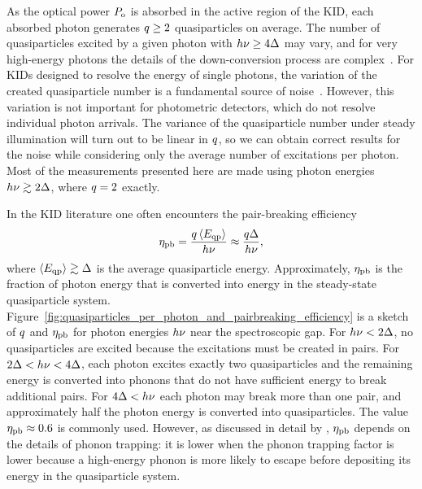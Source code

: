 As the optical power $P_{\mathrm{o}}$ is absorbed in the active region of the KID, each absorbed photon generates $q \ge 2$ quasiparticles on average.
The number of quasiparticles excited by a given photon with $h \nu \ge 4 \Delta$ may vary, and for very high-energy photons the details of the down-conversion process are complex~\autocite{Kozorezov2000PRB}.
For KIDs designed to resolve the energy of single photons, the variation of the created quasiparticle number is a fundamental source of noise~\autocite{Mazin2005}.
However, this variation is not important for photometric detectors, which do not resolve individual photon arrivals.
The variance of the quasiparticle number under steady illumination will turn out to be linear in $q$, so we can obtain correct results for the noise while considering only the average number of excitations per photon.
Most of the measurements presented here are made using photon energies $h \nu \gtrsim 2 \Delta$, where $q = 2$ exactly.

In the KID literature one often encounters the pair-breaking efficiency
\begin{equation}
\eta_\mathrm{pb}
  =
  \frac{q \expval{E_{\mathrm{qp}}}}{h \nu}
  \approx
  \frac{q \Delta}{h \nu},
\label{eqn:pbefficiency}
\end{equation}
where $\expval{E_{\mathrm{qp}}} \gtrsim \Delta$ is the average quasiparticle energy.
Approximately, $\eta_\mathrm{pb}$ is the fraction of photon energy that is converted into energy in the steady-state quasiparticle system.
Figure~\ref{fig:quasiparticles_per_photon_and_pairbreaking_efficiency} is a sketch of $q$ and $\eta_\mathrm{pb}$ for photon energies $h \nu$ near the spectroscopic gap.
For $h \nu < 2 \Delta$, no quasiparticles are excited because the excitations must be created in pairs.
For $2 \Delta < h \nu < 4 \Delta$, each photon excites exactly two quasiparticles and the remaining energy is converted into phonons that do not have sufficient energy to break additional pairs.
For $4 \Delta < h \nu$ each photon may break more than one pair, and approximately half the photon energy is converted into quasiparticles.
The value $\eta_\mathrm{pb} \approx 0.6$ is commonly used.
However, as discussed in detail by \textcite{Guruswamy2014SUST}, $\eta_\mathrm{pb}$ depends on the details of phonon trapping: it is lower when the phonon trapping factor is lower because a high-energy phonon is more likely to escape before depositing its energy in the quasiparticle system.

